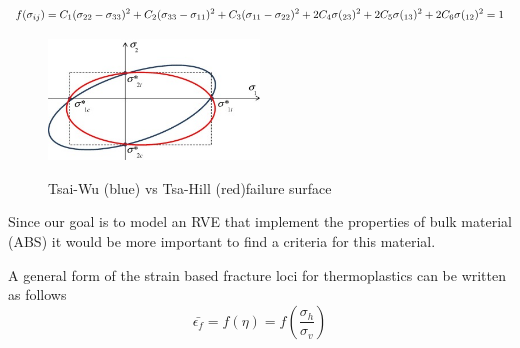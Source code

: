 \begin{equation}\label{AzziTsai}
f(\sigma_{ij})=C_1(\sigma_{22}-\sigma_{33})^2+C_2(\sigma_{33}-\sigma_{11})^2+C_3(\sigma_{11}-\sigma_{22})^2
\\
+2C_4\sigma(_{23})^2+2C_5\sigma(_{13})^2+2C_6\sigma(_{12})^2=1 
\end{equation}
\begin{figure}[H]
    \centering
    \includegraphics[width=0.5\textwidth]{chapter_2/figures/Tsaiandwu.jpg}
    \caption{Tsai-Wu (blue) vs Tsa-Hill (red)failure surface }
    \cite{Sheth2017NumericalOrientation}
    \label{fig:RVESheth}
\end{figure}

Since our goal is to model an RVE that implement the properties of bulk material (ABS) it would be more important to find a criteria for this material. 

A general form of the strain based fracture loci for thermoplastics can be written as follows
\begin{equation}\label{AzziTsai}
\bar{\epsilon_f}=f(\eta)=f(\frac{\sigma_h}{\sigma_v})
\end{equation}



